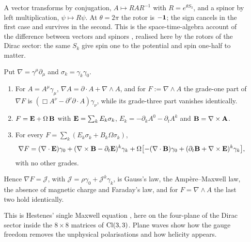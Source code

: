 A vector transforms by conjugation, $A\mapsto RAR^{-1}$ with $R=e^{\theta S_3}$, and a spinor by left multiplication,
$\psi\mapsto R\psi$. At $\theta=2\pi$ the rotor is $-\mathbf 1$; the sign cancels in the first case and survives in the second. This is the
space-time-algebra account of the difference between vectors and spinors \cite{Hestenes66}, realised here by the rotors of the Dirac
sector: the same $S_k$ give spin one to the potential and spin one-half to matter.

\begin{theorem}
\label{thm:nablaF}
Put $\nabla=\gamma^\mu\partial_\mu$ and $\sigma_k=\gamma_k\gamma_0$.
\begin{enumerate}[label=(\roman*),leftmargin=2.2em]
\item For $A=A^\mu\gamma_\mu$, $\nabla A=\partial\cdot A+\nabla\wedge A$, and for $F:=\nabla\wedge A$ the grade-one part of $\nabla F$ is
$(\Box A^\nu-\partial^\nu\partial\cdot A)\gamma_\nu$, while its grade-three part vanishes identically.
\item $F=\mathbf E+\Omega\,\mathbf B$ with $\mathbf E=\sum_kE_k\sigma_k$, $E_k=-\partial_kA^0-\partial_tA^k$ and $\mathbf B=\nabla\times\mathbf A$.
\item For every $F=\sum_k(E_k\sigma_k+B_k\Omega\sigma_k)$,
\[
\nabla F=(\nabla\cdot\mathbf E)\gamma_0+(\nabla\times\mathbf B-\partial_t\mathbf E)^k\gamma_k+\Omega\bigl[-(\nabla\cdot\mathbf B)\gamma_0+(\partial_t\mathbf B+\nabla\times\mathbf E)^k\gamma_k\bigr],
\]
with no other grades.
\end{enumerate}
Hence $\nabla F=\mathcal J$, with $\mathcal J=\rho\gamma_0+\mathcal J^k\gamma_k$, is Gauss's law, the Amp\`ere--Maxwell law, the absence of
magnetic charge and Faraday's law, and for $F=\nabla\wedge A$ the last two hold identically.
\end{theorem}

This is Hestenes' single Maxwell equation \cite{Hestenes66}, here on the four-plane of the Dirac sector inside the $8\times8$ matrices
of $\mathrm{Cl}(3,3)$. Plane waves show how the gauge freedom removes the unphysical polarisations and how helicity appears.

